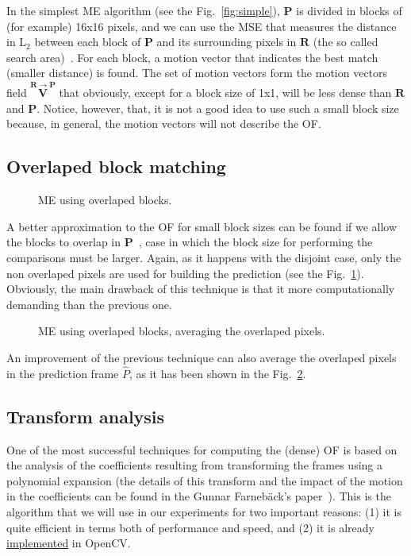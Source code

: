 In the simplest ME algorithm (see the Fig.~\ref{fig:simple}),
${\mathbf P}$ is divided in blocks of (for example) 16x16 pixels, and we can use the
MSE that measures the distance in L$_2$ between each block of
${\mathbf P}$ and its surrounding pixels in ${\mathbf R}$ (the so
called search area)~\cite{zhu2000new}. For each block, a motion vector
that indicates the best match (smaller distance) is found. The set of
motion vectors form the motion vectors field $\overset{{\mathbf
    R}\rightarrow {\mathbf P}}{\mathbf V}$ that obviously, except for
a block size of 1x1, will be less dense than ${\mathbf R}$ and
${\mathbf P}$. Notice, however, that, it is not a good idea to use
such a small block size because, in general, the motion vectors will
not describe the OF.

\subsection{Overlaped block matching}

\begin{figure}
  \centering
  \caption{ME using overlaped blocks.}
  \label{fig:overlaped}
\end{figure}

A better approximation to the OF for small block sizes can be found if
we allow the blocks to overlap in ${\mathbf
  P}$~\cite{orchard1994overlapped}, case in which the block size for
performing the comparisons must be larger. Again, as it happens with the
disjoint case, only the non overlaped pixels are used for building the
prediction (see the Fig.~\ref{fig:overlaped}). Obviously, the main
drawback of this technique is that it more computationally demanding
than the previous one.

\begin{figure}
  \centering
  \caption{ME using overlaped blocks, averaging the overlaped pixels.}
  \label{fig:average}
\end{figure}

An improvement of the previous technique can also average the
overlaped pixels in the prediction frame $\hat{P}$, as it has been
shown in the Fig.~\ref{fig:average}.

\subsection{Transform analysis}
One of the most successful techniques for computing the (dense) OF is
based on the analysis of the coefficients resulting from transforming
the frames using a polynomial expansion (the details of this transform
and the impact of the motion in the coefficients can be found in the
Gunnar Farneb{\"a}ck's paper~\cite{farneback2003two}). This is the
algorithm that we will use in our experiments for two important
reasons: (1) it is quite efficient in terms both of performance and
speed, and (2) it is already
\href{https://docs.opencv.org/3.4/d4/dee/tutorial_optical_flow.html}{implemented}
in OpenCV.

